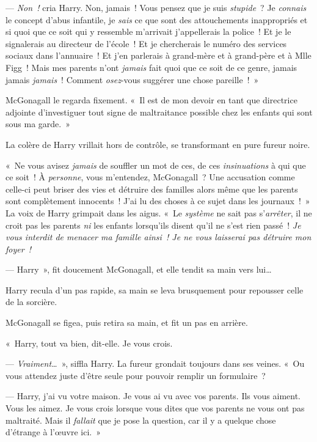 --- \emph{Non~!} cria Harry. Non, jamais~! Vous pensez que je suis \emph{stupide}~?
Je \emph{connais} le concept d'abus infantile, je \emph{sais} ce que sont des attouchements inappropriés et si quoi que ce soit qui y ressemble m'arrivait j'appellerais la police~!
Et je le signalerais au directeur de l'école~!
Et je chercherais le numéro des services sociaux dans l'annuaire~!
Et j'en parlerais à grand-mère et à grand-père et à Mlle Figg~!
Mais mes parents n'ont \emph{jamais} fait quoi que ce soit de ce genre, jamais jamais \emph{jamais}~!
Comment \emph{osez}-vous suggérer une chose pareille~!~»

McGonagall le regarda fixement. «~Il est de mon devoir en tant que directrice adjointe d'investiguer tout signe de maltraitance possible chez les enfants qui sont sous ma garde.~»

La colère de Harry vrillait hors de contrôle, se transformant en pure fureur noire.

«~Ne vous avisez \emph{jamais} de souffler un mot de ces, de ces \emph{insinuations} à qui que ce soit~!
À \emph{personne}, vous m'entendez, McGonagall~?
Une accusation comme celle-ci peut briser des vies et détruire des familles alors même que les parents sont complètement innocents~!
J'ai lu des choses à ce sujet dans les journaux~!~»
La voix de Harry grimpait dans les aigus.
«~Le \emph{système} ne sait pas s'\emph{arrêter}, il ne croit pas les parents \emph{ni} les enfants lorsqu'ils disent qu'il ne s'est rien passé~!
\emph{Je vous interdit de menacer ma famille ainsi~!  Je ne vous laisserai pas détruire mon foyer~!}

--- Harry~», fit doucement McGonagall, et elle tendit sa main vers lui…

Harry recula d'un pas rapide, sa main se leva brusquement pour repousser celle de la sorcière.

McGonagall se figea, puis retira sa main, et fit un pas en arrière.

«~Harry, tout va bien, dit-elle. Je vous crois.

--- \emph{Vraiment…}~», siffla Harry. La fureur grondait toujours dans ses veines.
«~Ou vous attendez juste d'être seule pour pouvoir remplir un formulaire~?

--- Harry, j'ai vu votre maison. Je vous ai vu avec vos parents. Ils vous aiment. Vous les aimez.
Je vous crois lorsque vous dites que vos parents ne vous ont pas maltraité.
Mais il \emph{fallait} que je pose la question, car il y a quelque chose d'étrange à l'œuvre ici.~»

